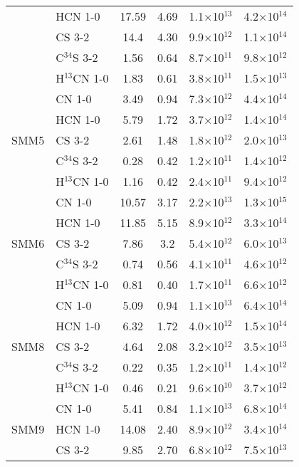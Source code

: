 \documentclass{aa}
\begin{document}
\begin{table*}
\begin{tabular}{l l c c c c}
{} & HCN 1-0 & 17.59 & 4.69 & 1.1$\times$10$^{13}$ & 4.2$\times$10$^{14}$\\ 
{} & CS 3-2 & 14.4 & 4.30 & 9.9$\times$10$^{12}$ & 1.1$\times$10$^{14}$\\  
{} & C$^{34}$S 3-2 & 1.56 & 0.64 & 8.7$\times$10$^{11}$ & 9.8$\times$10$^{12}$\\ 
{} & H$^{13}$CN 1-0 & 1.83 & 0.61 & 3.8$\times$10$^{11}$ & 1.5$\times$10$^{13}$\\ 
\hline
\multirow{5}{*}{SMM5} & CN 1-0 & 3.49 & 0.94 & 7.3$\times$10$^{12}$ & 4.4$\times$10$^{14}$\\
{} & HCN 1-0 & 5.79 & 1.72 & 3.7$\times$10$^{12}$ & 1.4$\times$10$^{14}$\\ 
{} & CS 3-2 & 2.61 & 1.48 & 1.8$\times$10$^{12}$ & 2.0$\times$10$^{13}$\\  
{} & C$^{34}$S 3-2 & 0.28 & 0.42 & 1.2$\times$10$^{11}$ & 1.4$\times$10$^{12}$ \\ 
{} & H$^{13}$CN 1-0 & 1.16 & 0.42  & 2.4$\times$10$^{11}$ & 9.4$\times$10$^{12}$ \\ 
\hline 
\multirow{5}{*}{SMM6} & CN 1-0 & 10.57 & 3.17 & 2.2$\times$10$^{13}$ & 1.3$\times$10$^{15}$\\
{} & HCN 1-0 & 11.85 & 5.15 & 8.9$\times$10$^{12}$ & 3.3$\times$10$^{14}$\\ 
{} & CS 3-2 & 7.86 & 3.2 & 5.4$\times$10$^{12}$ & 6.0$\times$10$^{13}$\\  
{} & C$^{34}$S 3-2 & 0.74 & 0.56 & 4.1$\times$10$^{11}$ & 4.6$\times$10$^{12}$ \\ 
{} & H$^{13}$CN 1-0 & 0.81 & 0.40 & 1.7$\times$10$^{11}$ & 6.6$\times$10$^{12}$\\ 
\hline
\multirow{5}{*}{SMM8} & CN 1-0 & 5.09 & 0.94 & 1.1$\times$10$^{13}$ & 6.4$\times$10$^{14}$\\
{} & HCN 1-0 & 6.32 & 1.72 & 4.0$\times$10$^{12}$ & 1.5$\times$10$^{14}$ \\ 
{} & CS 3-2 & 4.64 & 2.08 & 3.2$\times$10$^{12}$ & 3.5$\times$10$^{13}$ \\  
{} & C$^{34}$S 3-2 & 0.22 & 0.35 & 1.2$\times$10$^{11}$ & 1.4$\times$10$^{12}$\\ 
{} & H$^{13}$CN 1-0 & 0.46 & 0.21 & 9.6$\times$10$^{10}$ & 3.7$\times$10$^{12}$\\ 
\hline
\multirow{5}{*}{SMM9} & CN 1-0 & 5.41 & 0.84 & 1.1$\times$10$^{13}$ & 6.8$\times$10$^{14}$\\
{} & HCN 1-0 & 14.08 & 2.40 & 8.9$\times$10$^{12}$ & 3.4$\times$10$^{14}$ \\ 
{} & CS 3-2 & 9.85 & 2.70 & 6.8$\times$10$^{12}$ & 7.5$\times$10$^{13}$\\ 

\end{tabular}
\end{table*}
\end{document}
